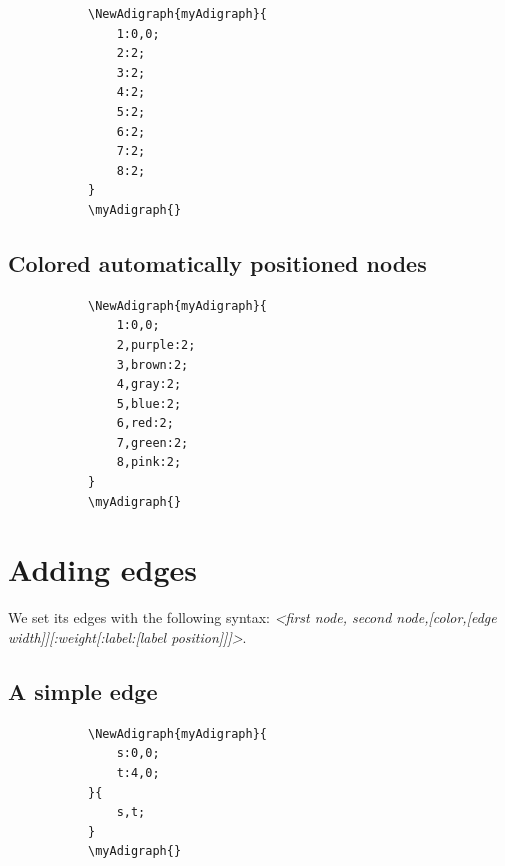 \documentclass{report}
\begin{document}
\begin{figure}
	\begin{subfigure}{0.49\textwidth}
		\begin{verbatim}
\NewAdigraph{myAdigraph}{
	1:0,0;
	2:2;
	3:2;
	4:2;
	5:2;
	6:2;
	7:2;
	8:2;
}
\myAdigraph{}
\end{verbatim}
	\end{subfigure}
	\begin{subfigure}{0.49\textwidth}
		\myAdigraph{}
	\end{subfigure}
\end{figure}

\subsection{Colored automatically positioned nodes}

\begin{figure}
	\begin{subfigure}{0.49\textwidth}
		\begin{verbatim}
\NewAdigraph{myAdigraph}{
	1:0,0;
	2,purple:2;
	3,brown:2;
	4,gray:2;
	5,blue:2;
	6,red:2;
	7,green:2;
	8,pink:2;
}
\myAdigraph{}
\end{verbatim}
	\end{subfigure}
	\begin{subfigure}{0.49\textwidth}
		\myAdigraph{}
	\end{subfigure}
\end{figure}


\section{Adding edges}
We set its edges with the following syntax: \textit{<first node, second node,[color,[edge width]][:weight[:label:[label position]]]>}.

\subsection{A simple edge}
\begin{figure}
	\begin{subfigure}{0.49\textwidth}
		\begin{verbatim}
\NewAdigraph{myAdigraph}{
 	s:0,0;
 	t:4,0;
}{
	s,t;
}
\myAdigraph{}
\end{verbatim}
	\end{subfigure}
	\begin{subfigure}{0.49\textwidth}
		\myAdigraph{}
	\end{subfigure}
\end{figure}
\end{document}
